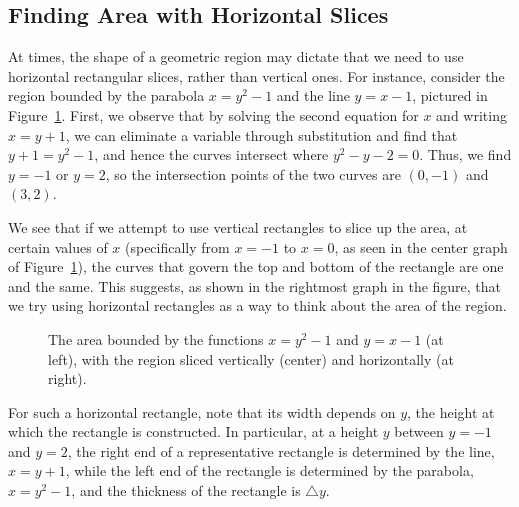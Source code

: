 \vspace*{5pt}
\nin {}
\vspace*{1pt}

\newpage



\subsection*{Finding Area with Horizontal Slices}

At times, the shape of a geometric region may dictate that we need to use horizontal rectangular slices, rather than vertical ones.  For instance, consider the region bounded by the parabola $x = y^2 - 1$ and the line $y = x-1$, pictured in Figure~\ref{F:6.1.IntWRTy}.  First, we observe that by solving the second equation for $x$ and writing $x = y + 1$, we can eliminate a variable through substitution and find that $y+1 = y^2 - 1$, and hence the curves intersect where $y^2 - y - 2 = 0$.  Thus, we find $y = -1$ or $y = 2$, so the intersection points of the two curves are $(0,-1)$ and $(3,2)$.

We see that if we attempt to use vertical rectangles to slice up the area, at certain values of $x$ (specifically from $x = -1$ to $x = 0$, as seen in the center graph of Figure~\ref{F:6.1.IntWRTy}), the curves that govern the top and bottom of the rectangle are one and the same.  This suggests, as shown in the rightmost graph in the figure, that we try using horizontal rectangles as a way to think about the area of the region.
\begin{figure}[h]
\begin{center}
\caption{The area bounded by the functions $x = y^2-1$ and $y = x-1$ (at left), with the region sliced vertically (center) and horizontally (at right).} \label{F:6.1.IntWRTy}
\end{center}
\end{figure}
For such a horizontal rectangle, note that its width depends on $y$, the height at which the rectangle is constructed.  In particular, at a height $y$ between $y = -1$ and $y = 2$, the right end of a representative rectangle is determined by the line, $x = y+1$, while the left end of the rectangle is determined by the parabola, $x = y^2-1$, and the thickness of the rectangle is $\triangle y$.  


